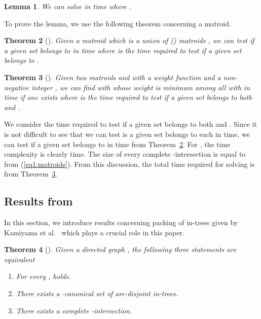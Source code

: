 \documentclass[11pt]{article}
\newcounter{ni}
\theoremstyle{plain}
\newtheorem{theorem}{Theorem}[section]
\newtheorem{lemma}[theorem]{Lemma}\newtheorem{corollary}[theorem]{Corollary}\newtheorem{definition}[theorem]{Definition}\newtheorem{proposition}[theorem]{Proposition}\newtheorem{claim}[theorem]{Claim}\newtheorem{fact}[theorem]{Fact}\newtheorem{example}{Example}
\newcommand{\eop}{\hfill \usebox{\ProofSym}}
\newenvironment{proof}{\noindent {\it Proof.}}{\eop\par\vspace{0.3cm}}
\begin{document}
\begin{lemma} \label{lemma:matroid}
We can solve  in 
 time where . 
\end{lemma}
\begin{proof}
To prove the lemma, we use the following theorem concerning a matroid. 

\begin{theorem}[\cite{K74}] \label{theorem:matroid-knuth}
Given a matroid  
which is a union of  () matroids , 
we can test if a given set belongs to 
 in  time where  is the time required 
to test if a given set belongs to . 
\end{theorem}

\begin{theorem}[\cite{F81}] \label{theorem:matroid-frank}
Given two matroids  and  with a weight function 
 and a non-negative integer , 
we can find  with  whose weight is minimum among all 
 with  in  time if one 
exists where  is the time required to test if 
a given set belongs to both  and . 
\end{theorem}

We consider the time required to test if a given set 
belongs to both  and . 
Since it is not difficult to see that 
we can test is a given set belongs to each 
in  time, 
we can test if a given set belongs to  in
 time from Theorem~\ref{theorem:matroid-knuth}. 
For , the time complexity is clearly  time. 
The size of every complete -intersection is equal to 
 from (\ref{eq1:matroids}). 
From this discussion, the total time required for solving  is  from 
Theorem~\ref{theorem:matroid-frank}. 
\end{proof}

\subsection{Results from \cite{KKT08}}

In this section, we introduce results concerning packing of in-trees given by 
Kamiyama et al.~\cite{KKT08} which plays a crucial role in this paper.  

\begin{theorem}[\cite{KKT08}] \label{theorem:KKT08}
Given a directed graph  , the following three statements are equivalent
\begin{enumerate}
\item For every ,  holds.
\item There exists a -canonical set of arc-disjoint in-trees. 
\item There exists a complete -intersection. 
\end{enumerate}
\end{theorem}
\end{document}
